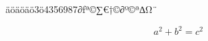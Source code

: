 \documentclass[parskip=half,12pt]{scrartcl}
\begin{document}
äöäöäö3ö4356987∂ƒª©∑€†©∂º©ª∆Ω¨

\[a^2 + b^2 = c^2 \]

\blindtext[6]
\end{document}
